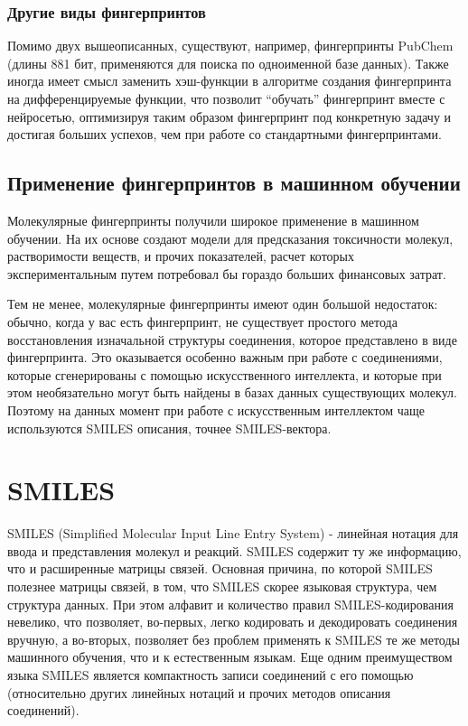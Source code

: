 \documentclass[a4paper,14pt]{extreport}
\begin{document}
  \subsection{Другие виды фингерпринтов}
  \label{ss:fp_other_subsec}
  Помимо двух вышеописанных, существуют, например, фингерпринты PubChem (длины 881 бит, применяются для поиска по одноименной базе данных). Также иногда имеет смысл заменить хэш-функции в алгоритме создания фингерпринта на дифференцируемые функции, что позволит “обучать” фингерпринт вместе с нейросетью, оптимизируя таким образом фингерпринт под конкретную задачу и достигая больших успехов, чем при работе со стандартными фингерпринтами.
  
  \section{Применение фингерпринтов в машинном обучении}
  \label{s:fp_application}
  Молекулярные фингерпринты получили широкое применение в машинном обучении. На их основе создают модели для предсказания токсичности молекул, растворимости веществ, и прочих показателей, расчет которых экспериментальным путем потребовал бы гораздо больших финансовых затрат.
  
Тем не менее, молекулярные фингерпринты имеют один большой недостаток: обычно, когда у вас есть фингерпринт, не существует простого метода восстановления изначальной структуры соединения, которое представлено в виде фингерпринта. Это оказывается особенно важным при работе с соединениями, которые сгенерированы с помощью искусственного интеллекта, и которые при этом необязательно могут быть найдены в базах данных существующих молекул.
Поэтому на данных момент при работе с искусственным интеллектом чаще используются SMILES описания, точнее SMILES-вектора.

  
  \chapter{SMILES}
  \label{c:smiles}
  SMILES (Simplified Molecular Input Line Entry System) - линейная нотация для ввода и представления молекул и реакций. SMILES содержит ту же информацию, что и расширенные матрицы связей. Основная причина, по которой SMILES полезнее матрицы связей, в том, что SMILES скорее языковая структура, чем структура данных. При этом алфавит и количество правил SMILES-кодирования невелико, что позволяет, во-первых, легко кодировать и декодировать соединения вручную, а во-вторых, позволяет без проблем применять к SMILES те же методы машинного обучения, что и к естественным языкам.
Еще одним преимуществом языка SMILES является компактность записи соединений с его помощью (относительно других линейных нотаций и прочих методов описания соединений).
\end{document}
